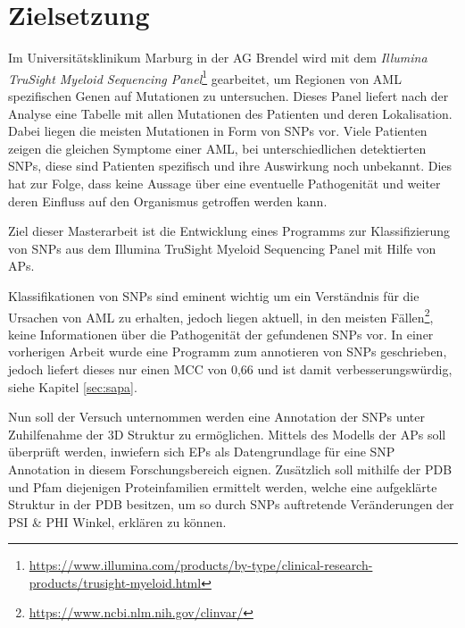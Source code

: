 \section{Zielsetzung}

Im Universitätsklinikum Marburg in der AG Brendel wird mit dem \emph{Illumina TruSight Myeloid Sequencing Panel}\footnote{\url{https://www.illumina.com/products/by-type/clinical-research-products/trusight-myeloid.html}} gearbeitet, um Regionen von \ac{AML} spezifischen Genen auf Mutationen zu untersuchen. Dieses Panel liefert nach der Analyse eine Tabelle mit allen Mutationen des Patienten und deren Lokalisation. Dabei liegen die meisten Mutationen in Form von \ac{SNP}s vor. Viele Patienten zeigen die gleichen Symptome einer \ac{AML}, bei unterschiedlichen detektierten \ac{SNP}s, diese sind Patienten spezifisch und ihre Auswirkung noch unbekannt. Dies hat zur Folge, dass keine Aussage über eine eventuelle Pathogenität und weiter deren Einfluss auf den Organismus getroffen werden kann. 

Ziel dieser Masterarbeit ist die Entwicklung eines Programms zur Klassifizierung von \ac{SNP}s aus dem Illumina TruSight Myeloid Sequencing Panel mit Hilfe von \ac{APs}.

Klassifikationen von \ac{SNP}s sind eminent wichtig um ein Verständnis für die Ursachen von \ac{AML} zu erhalten, jedoch liegen aktuell, in den meisten Fällen\footnote{\url{https://www.ncbi.nlm.nih.gov/clinvar/}}, keine Informationen über die Pathogenität der gefundenen \ac{SNP}s vor. In einer vorherigen Arbeit wurde eine Programm zum annotieren von \ac{SNP}s geschrieben, jedoch liefert dieses nur einen \ac{MCC} von 0,66 und ist damit verbesserungswürdig, siehe Kapitel \ref{sec:sapa}. 

Nun soll der Versuch unternommen werden eine Annotation der \ac{SNP}s unter Zuhilfenahme der 3D Struktur zu ermöglichen. Mittels des Modells der \ac{APs} soll überprüft werden, inwiefern sich \ac{EP}s als Datengrundlage für eine \ac{SNP} Annotation in diesem Forschungsbereich eignen. Zusätzlich soll mithilfe der \ac{PDB} und \ac{Pfam} diejenigen Proteinfamilien ermittelt werden, welche eine aufgeklärte Struktur in der \ac{PDB} besitzen, um so durch \ac{SNP}s auftretende Veränderungen der PSI \& PHI Winkel, erklären zu können. 



